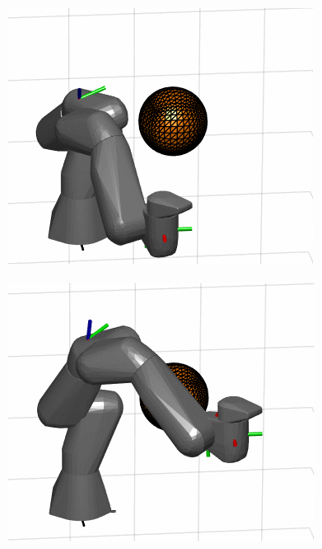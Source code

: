 \documentclass[../main.tex]{subfiles}
\begin{document}
\begin{figure}[H]
    \centering
    \begin{subfigure}[b]{0.24\textwidth}
        \centering
        \includegraphics[width=\textwidth]{figures/linkcollision/g100_1.png}
        \label{}
    \end{subfigure}
    \begin{subfigure}[b]{0.24\textwidth}
        \centering
         \includegraphics[width=\textwidth]{figures/linkcollision/g100_2.png}
        \label{}
    \end{subfigure}

\end{figure}
\end{document}
